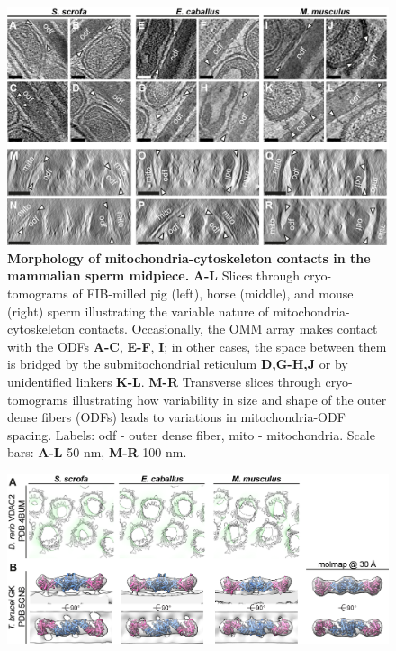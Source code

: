 \begin{subappendices}
\begin{figure}[hbt]
        \label{fig:ch4_app_fig3}
    \end{figure}
    \begin{figure}[hbt]
        \center
        \includegraphics[]{Chapter.4/Figures/SI_Figure4.png}
        \caption{\textbf{Morphology of mitochondria-cytoskeleton contacts in the mammalian sperm midpiece.} \textbf{A-L} Slices through cryo-tomograms of FIB-milled pig (left), horse (middle), and mouse (right) sperm illustrating the variable nature of mitochondria-cytoskeleton contacts. Occasionally, the OMM array makes contact with the ODFs \textbf{A-C}, \textbf{E-F}, \textbf{I}; in other cases, the space between them is bridged by the submitochondrial reticulum \textbf{D,G-H,J} or by unidentified linkers \textbf{K-L}. \textbf{M-R} Transverse slices through cryo-tomograms illustrating how variability in size and shape of the outer dense fibers (ODFs) leads to variations in mitochondria-ODF spacing. Labels: odf - outer dense fiber, mito - mitochondria. Scale bars: \textbf{A-L} 50 nm, \textbf{M-R} 100 nm.}
        \label{fig:ch4_app_fig4}
    \end{figure}
    \begin{figure}[hbt]
        \center
        \includegraphics[]{Chapter.4/Figures/SI_Figure5.png}

\end{figure}
\end{subappendices}
